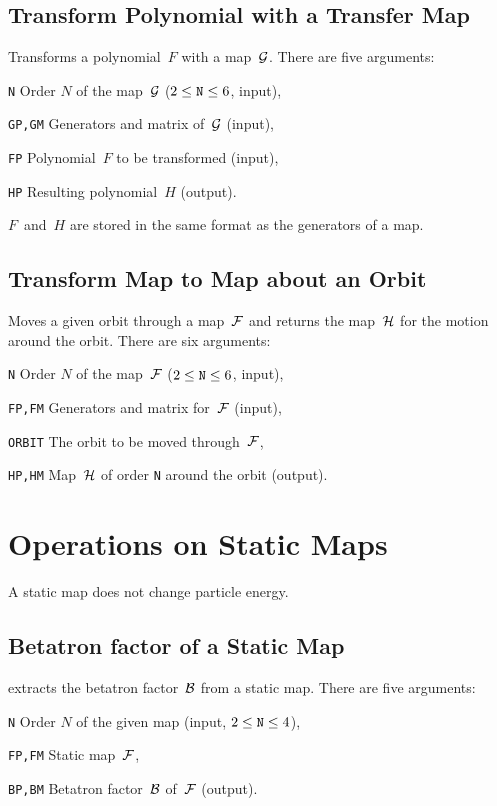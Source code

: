 \subsection{Transform Polynomial with a Transfer Map}
\label{LAFXFM}
Transforms a polynomial~$F$ with a map~$\cal G$.
There are five arguments:
\begin{mylist}
\item[\tt N]
Order $N$ of the map~$\cal G$ ($2 \le \hbox{\tt N} \le 6$, input),
\item[\tt GP,GM]
Generators and matrix of~$\cal G$ (input),
\item[\tt FP]
Polynomial~$F$ to be transformed (input),
\item[\tt HP]
Resulting polynomial~$H$ (output).
\end{mylist}
$F$~and~$H$ are stored in the same format as the generators of a map.
 
\subsection{Transform Map to Map about an Orbit}
\label{LAMOVE}
Moves a given orbit through a map~$\cal F$ and returns the map~$\cal H$
for the motion around the orbit.
There are six arguments:
\begin{mylist}
\item[\tt N]
Order $N$ of the map~$\cal F$ ($2 \le \hbox{\tt N} \le 6$, input),
\item[\tt FP,FM]
Generators and matrix for~$\cal F$ (input),
\item[\tt ORBIT]
The orbit to be moved through~$\cal F$,
\item[\tt HP,HM]
Map~$\cal H$ of order {\tt N} around the orbit
(output).
\end{mylist}

\section{Operations on Static Maps}
A static map does not change particle energy.

\subsection{Betatron factor of a Static Map}
\label{LABETA}
extracts the betatron factor~$\cal B$ from a static map.
There are five arguments:
\begin{mylist}
\item[\tt N]
Order $N$ of the given map (input, $2 \le \hbox{\tt N} \le 4$),
\item[\tt FP,FM]
Static map~$\cal F$,
\item[\tt BP,BM]
Betatron factor~$\cal B$ of~$\cal F$ (output).
\end{mylist}
 
